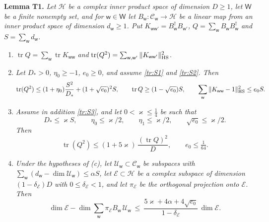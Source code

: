 \documentclass[11pt,letterpaper]{article}
\begin{document}
\textbf{Lemma T1.} \emph{Let $\mathcal H$ be a complex inner product space of dimension $D\ge1$, let
$\mathsf W$ be a finite nonempty set, and for $\mathsf w\in\mathsf W$ let
$B_{\mathsf w}:\mathcal C_{\mathsf w}\to\mathcal H$ be a linear map from an inner product space of dimension
$d_{\mathsf w}\ge1$. Put $K_{\mathsf w\mathsf w'}=B_{\mathsf w}^\dagger B_{\mathsf w'}$,
$Q=\sum_{\mathsf w}B_{\mathsf w}B_{\mathsf w}^\dagger$ and $S=\sum_{\mathsf w}d_{\mathsf w}$.}
\begin{enumerate}[label=\textup{(\alph*)},leftmargin=2.2em]
\item $\operatorname{tr}Q=\sum_{\mathsf w}\operatorname{tr}K_{\mathsf w\mathsf w}$ \emph{and}
$\operatorname{tr}(Q^2)=\sum_{\mathsf w,\mathsf w'}\|K_{\mathsf w\mathsf w'}\|_{\rm HS}^2$.
\item \emph{Let $D_*>0$, $\eta_0\ge-1$, $e_0\ge0$, and assume \eqref{tr:S1} and \eqref{tr:S2}. Then}
\begin{equation}\label{tr:cor}
 \operatorname{tr}(Q^2)\le(1+\eta_0)\frac{S^2}{D_*}+(1+\sqrt{e_0})^2S,\qquad
 \operatorname{tr}Q\ge(1-\sqrt{e_0})S,\qquad \sum_{\mathsf w}\|K_{\mathsf w\mathsf w}-1\|_{\rm HS}^2\le e_0S .
\end{equation}
\item \emph{Assume in addition \eqref{tr:S3}, and let $0<\varkappa\le\frac14$ be such that}
\begin{equation}\label{tr:kap}
 D_*\le\varkappa S,\qquad \eta_0\le\varkappa/2,\qquad\eta_1\le\varkappa/2,\qquad\sqrt{e_0}\le\varkappa/2 .
\end{equation}
\emph{Then}
\begin{equation}\label{tr:F1}
 \operatorname{tr}(Q^2)\le(1+5\varkappa)\,\frac{(\operatorname{tr}Q)^2}{D},\qquad e_0\le\tfrac1{64}.
\end{equation}
\item \emph{Under the hypotheses of \textup{(c)}, let $\mathcal U_{\mathsf w}\subset\mathcal C_{\mathsf w}$ be
subspaces with $\sum_{\mathsf w}(d_{\mathsf w}-\dim\mathcal U_{\mathsf w})\le\alpha S$, let
$\mathcal E\subset\mathcal H$ be a complex subspace of dimension $(1-\delta_{\mathcal E})D$ with $0\le\delta_{\mathcal E}<1$,
and let $\pi_{\mathcal E}$ be the orthogonal projection onto $\mathcal E$. Then}
\begin{equation}\label{tr:codim}
 \dim\mathcal E-\dim\sum_{\mathsf w}\pi_{\mathcal E} B_{\mathsf w}\,\mathcal U_{\mathsf w}
 \ \le\ \frac{5\varkappa+4\alpha+4\sqrt{e_0}}{1-\delta_{\mathcal E}}\,\dim\mathcal E .
\end{equation}
\end{enumerate}
\end{document}
